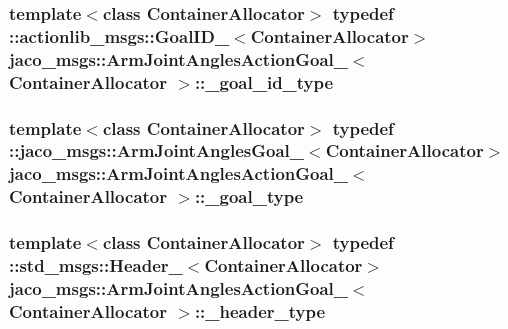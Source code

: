 \subsubsection[{\texorpdfstring{\+\_\+goal\+\_\+id\+\_\+type}{_goal_id_type}}]{\setlength{\rightskip}{0pt plus 5cm}template$<$class Container\+Allocator$>$ typedef \+::actionlib\+\_\+msgs\+::\+Goal\+I\+D\+\_\+$<$Container\+Allocator$>$ {\bf jaco\+\_\+msgs\+::\+Arm\+Joint\+Angles\+Action\+Goal\+\_\+}$<$ Container\+Allocator $>$\+::{\bf \+\_\+goal\+\_\+id\+\_\+type}}\hypertarget{structjaco__msgs_1_1ArmJointAnglesActionGoal___aa65aa60f77df79b587a07808da34d260}{}\label{structjaco__msgs_1_1ArmJointAnglesActionGoal___aa65aa60f77df79b587a07808da34d260}
\subsubsection[{\texorpdfstring{\+\_\+goal\+\_\+type}{_goal_type}}]{\setlength{\rightskip}{0pt plus 5cm}template$<$class Container\+Allocator$>$ typedef \+::{\bf jaco\+\_\+msgs\+::\+Arm\+Joint\+Angles\+Goal\+\_\+}$<$Container\+Allocator$>$ {\bf jaco\+\_\+msgs\+::\+Arm\+Joint\+Angles\+Action\+Goal\+\_\+}$<$ Container\+Allocator $>$\+::{\bf \+\_\+goal\+\_\+type}}\hypertarget{structjaco__msgs_1_1ArmJointAnglesActionGoal___a9db4408e5eda0965ab7c3334e53a7a24}{}\label{structjaco__msgs_1_1ArmJointAnglesActionGoal___a9db4408e5eda0965ab7c3334e53a7a24}
\subsubsection[{\texorpdfstring{\+\_\+header\+\_\+type}{_header_type}}]{\setlength{\rightskip}{0pt plus 5cm}template$<$class Container\+Allocator$>$ typedef \+::std\+\_\+msgs\+::\+Header\+\_\+$<$Container\+Allocator$>$ {\bf jaco\+\_\+msgs\+::\+Arm\+Joint\+Angles\+Action\+Goal\+\_\+}$<$ Container\+Allocator $>$\+::{\bf \+\_\+header\+\_\+type}}\hypertarget{structjaco__msgs_1_1ArmJointAnglesActionGoal___a43ebc2f136a276a4506784e53fd194ae}{}\label{structjaco__msgs_1_1ArmJointAnglesActionGoal___a43ebc2f136a276a4506784e53fd194ae}
